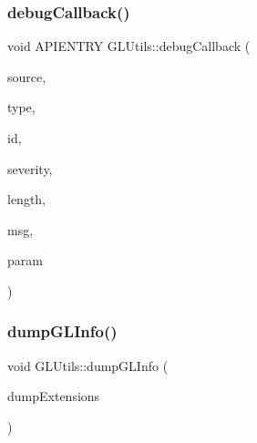 \subsubsection{\texorpdfstring{debugCallback()}{debugCallback()}}
{\footnotesize\ttfamily void A\+P\+I\+E\+N\+T\+RY G\+L\+Utils\+::debug\+Callback (\begin{DoxyParamCaption}\item[{G\+Lenum}]{source,  }\item[{G\+Lenum}]{type,  }\item[{G\+Luint}]{id,  }\item[{G\+Lenum}]{severity,  }\item[{G\+Lsizei}]{length,  }\item[{const G\+Lchar $\ast$}]{msg,  }\item[{const void $\ast$}]{param }\end{DoxyParamCaption})}

\mbox{\label{namespace_g_l_utils_afbb44734b4804fdf35a4adb3b620ece5}} 
\subsubsection{\texorpdfstring{dumpGLInfo()}{dumpGLInfo()}}
{\footnotesize\ttfamily void G\+L\+Utils\+::dump\+G\+L\+Info (\begin{DoxyParamCaption}\item[{bool}]{dump\+Extensions }\end{DoxyParamCaption})}


